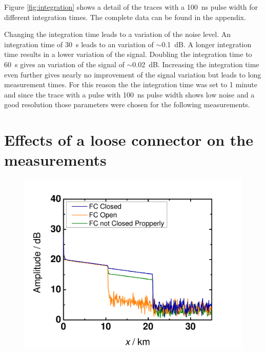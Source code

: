 Figure \ref{fig:integration} shows a detail of the traces with a 100~ns pulse width for different integration times. The complete data can be found in the appendix.

Changing the integration time leads to a variation of the noise level. An integration time of 30~s leads to an variation of $\sim$0.1~dB. A longer integration time results in a lower variation of the signal. 
Doubling the integration time to 60~s gives an variation of the signal of $\sim$0.02~dB. Increasing the integration time even further gives nearly no improvement of the signal variation but leads to long measurement times.
For this reason the the integration time was set to 1 minute and since the trace with a pulse with 100~ns pulse width shows low noise and a good resolution those parameters were chosen for the following measurements.


% 
%
%
%
%




\section{Effects of a loose connector on the measurements}

\begin{figure}%
\centering
\includegraphics[width=.8\columnwidth]{grafiken/Connector.pdf}%
\caption{}%
\label{fig:connector}%
\end{figure}

